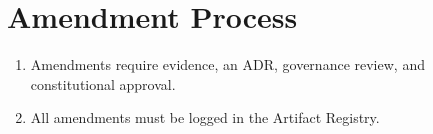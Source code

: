 \documentclass[11pt]{article}
\begin{document}
\section{Amendment Process}
\begin{enumerate}[label=\arabic*.]
\item Amendments require evidence, an ADR, governance review, and constitutional approval.
\item All amendments must be logged in the Artifact Registry.
\end{enumerate}
\end{document}
